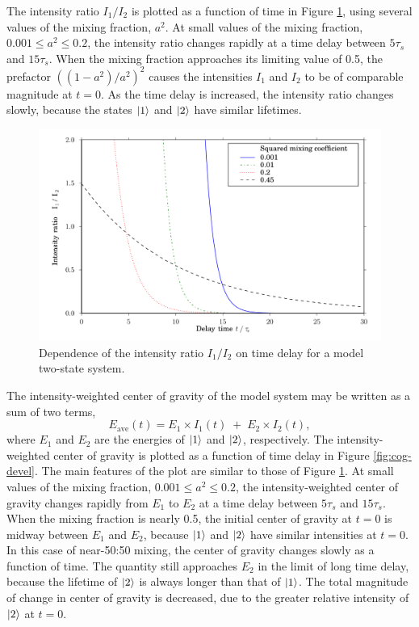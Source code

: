 The intensity ratio $I_1/I_2$ is plotted as a function of time in
Figure \ref{fig:ratio-devel}, using several values of the mixing
fraction, $a^2$.  At small values of the mixing fraction, $0.001
\leq a^2 \leq 0.2$, the intensity ratio changes rapidly at a time
delay between $5\tau_s$ and $15\tau_s$.  When the mixing fraction
approaches its limiting value of 0.5, the prefactor $( (1 -
a^2)/a^2 )^2$ causes the intensities $I_1$ and $I_2$ to be
of comparable magnitude at $t=0$.  As the time delay is increased, the
intensity ratio changes slowly, because the states $\mathinner{|{1}\rangle}$ and
$\mathinner{|{2}\rangle}$ have similar lifetimes.

\begin{figure}
  \caption{Dependence of the intensity ratio $I_1/I_2$ on time delay
    for a model two-state system.}
  \label{fig:ratio-devel}

  \centering
  \includegraphics[width=6in]{ratio-development.pdf}
\end{figure}

The intensity-weighted center of gravity of the model system may be
written as a sum of two terms,
\begin{equation}
  E_{\text{ave}}(t) = E_1 \times I_1(t) \; + \; E_2 \times I_2(t),
\end{equation}
where $E_1$ and $E_2$ are the energies of $\mathinner{|{1}\rangle}$ and $\mathinner{|{2}\rangle}$,
respectively.  The intensity-weighted center of gravity is plotted as
a function of time delay in Figure \ref{fig:cog-devel}.  The main
features of the plot are similar to those of Figure
\ref{fig:ratio-devel}.  At small values of the mixing fraction, $0.001
\leq a^2 \leq 0.2$, the intensity-weighted center of gravity changes
rapidly from $E_1$ to $E_2$ at a time delay between $5\tau_s$ and
$15\tau_s$.  When the mixing fraction is nearly 0.5, the initial
center of gravity at $t=0$ is midway between $E_1$ and $E_2$, because
$\mathinner{|{1}\rangle}$ and $\mathinner{|{2}\rangle}$ have similar intensities at $t=0$.  In this
case of near-50:50 mixing, the center of gravity changes slowly as a
function of time.  The quantity still approaches $E_2$ in the limit of
long time delay, because the lifetime of $\mathinner{|{2}\rangle}$ is always longer
than that of $\mathinner{|{1}\rangle}$.  The total magnitude of change in center of
gravity is decreased, due to the greater relative intensity of
$\mathinner{|{2}\rangle}$ at $t=0$.


